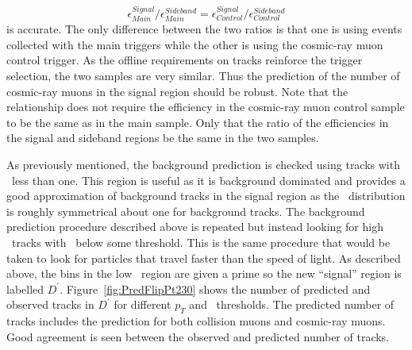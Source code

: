 \begin{equation}
\epsilon_{Main}^{Signal}/ \epsilon_{Main}^{Sideband} = \epsilon_{Control}^{Signal} / \epsilon_{Control}^{Sideband}
\label{eq:ReducedCosmicPredRatio}
\end{equation}
is accurate. The only difference between the two ratios is that one is using events collected with the main triggers while the
other is using the cosmic-ray muon control trigger. As the offline requirements on tracks reinforce the trigger selection,
the two samples are very similar.
Thus the prediction of the number of cosmic-ray muons in the signal region should be robust. Note that the relationship does not require the efficiency
in the cosmic-ray muon control sample to be the same as in the main sample. Only that the ratio of the efficiencies in the signal and sideband regions
be the same in the two samples.

As previously mentioned, the background prediction is checked using tracks with \invbeta\ less than one. This region is useful as it is background dominated
and provides a good approximation of background tracks in the signal region as the \invbeta\ distribution is roughly symmetrical about one for background tracks.
The background prediction procedure described above is repeated but instead looking for high \pt\ tracks with \invbeta\ below some threshold.
This is the same procedure that would be taken to look for particles that travel faster than the speed of light.
As described above, the bins in the low \invbeta\ region are given a prime so the new ``signal'' region is labelled $D^{\prime}$.
Figure~\ref{fig:PredFlipPt230} shows the number of predicted and observed tracks in $D^{\prime}$ for different $p_T$
and \invbeta\ thresholds. The predicted number of tracks includes the prediction for both collision muons and cosmic-ray muons.
Good agreement is seen between the observed and predicted number of tracks. 


